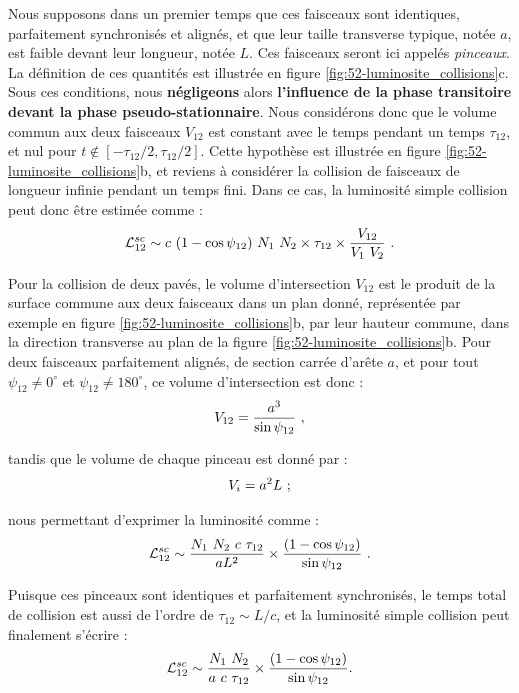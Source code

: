 \begin{refsection}
Nous supposons dans un premier temps que ces faisceaux sont identiques, parfaitement synchronisés et alignés, et que leur taille transverse typique, notée $a$, est faible devant leur longueur, notée $L$. Ces faisceaux seront ici appelés \textit{pinceaux}. La définition de ces quantités est illustrée en figure \ref{fig:52-luminosite_collisions}c. Sous ces conditions, nous \textbf{négligeons} alors \textbf{l'influence de la phase transitoire devant la phase pseudo-stationnaire}. Nous considérons donc que le volume commun aux deux faisceaux $V_{12}$ est constant avec le temps pendant un temps $\tau_{12}$, et nul pour $t \notin [-\tau_{12}/2, \tau_{12}/2]$. Cette hypothèse est illustrée en figure \ref{fig:52-luminosite_collisions}b, et reviens à considérer la collision de faisceaux de longueur infinie pendant un temps fini. Dans ce cas, la luminosité simple collision peut donc être estimée comme :
\begin{equation}
    \mathcal{L}_{12}^{sc} \sim c ~ (1-\cos{\psi_{12}}) ~ N_1 ~ N_2 \times \tau_{12} \times \dfrac{V_{12}}{V_1 ~ V_2} ~ \rm .
\end{equation}

Pour la collision de deux pavés, le volume d'intersection $V_{12}$ est le produit de la surface commune aux deux faisceaux dans un plan donné, représentée par exemple en figure \ref{fig:52-luminosite_collisions}b, par leur hauteur commune, dans la direction transverse au plan de la figure \ref{fig:52-luminosite_collisions}b. Pour deux faisceaux parfaitement alignés, de section carrée d’arête $a$, et pour tout $\psi_{12}\neq 0^\circ$ et $\psi_{12}\neq 180^\circ$, ce volume d'intersection est donc :
\begin{equation}
    V_{12} = \dfrac{a^3}{\sin\psi_{12}} ~ \rm ,
\end{equation}

tandis que le volume de chaque pinceau est donné par :
\begin{equation}
V_i = a^2 L ~ \rm ;
\end{equation}

nous permettant d'exprimer la luminosité comme :
\begin{equation}
    \mathcal{L}_{12}^{sc} \sim \dfrac{N_1 ~ N_2 ~ c ~ \tau_{12}}{a L^2} \times \dfrac{(1-\cos{\psi_{12}})}{\sin{\psi_{12}}} ~ \rm .
    \label{eq:52-luminosite_temps}
\end{equation}

Puisque ces pinceaux sont identiques et parfaitement synchronisés, le temps total de collision est aussi de l'ordre de $\tau_{12} \sim L/c$, et la luminosité simple collision peut finalement s'écrire :
\begin{equation}
    \mathcal{L}_{12}^{sc} \sim \dfrac{N_1 ~ N_2}{a ~ c ~ \tau_{12}} \times \dfrac{(1-\cos{\psi_{12}})}{\sin{\psi_{12}}}\rm .
    \label{eq:52-luminosite_pinceaux}
\end{equation}


\end{refsection}
